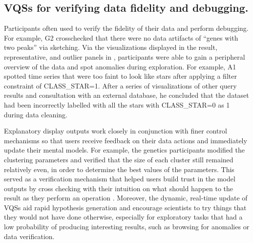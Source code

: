 \subsection{VQSs for verifying data fidelity and debugging.}
\par Participants often used \zv to verify the fidelity of their data and perform debugging. For example, G2 crosschecked that there were no data artifacts of ``genes with two peaks'' via sketching.  Via the visualizations displayed in the result, representative, and outlier panels in \zv, participants were able to gain a peripheral overview of the data and spot anomalies during exploration. For example, A1 spotted time series that were too faint to look like stars after applying a filter constraint of CLASS\_STAR=1. After a series of visualizations of other query results and consultation with an external database, he concluded that the dataset had been incorrectly labelled with all the stars with CLASS\_STAR=0 as 1 during data cleaning. 
\par Explanatory display outputs  work closely in conjunction with finer control mechanisms so that users receive feedback on their data actions and immediately update their mental models. For example, the genetics participants modified the clustering parameters and verified that the size of each cluster still remained relatively even, in order to determine the best values of the parameters. This served as a verification mechanism that helped users build trust in the model outputs by cross checking with their intuition on what should happen to the result as they perform an operation \cite{Chuang2012}. Moreover, the dynamic, real-time update of VQSs aid rapid hypothesis generation and encourage scientists to try things that they would not have done otherwise, especially for exploratory tasks that had a low probability of producing interesting results, such as browsing for anomalies  or data verification. 
